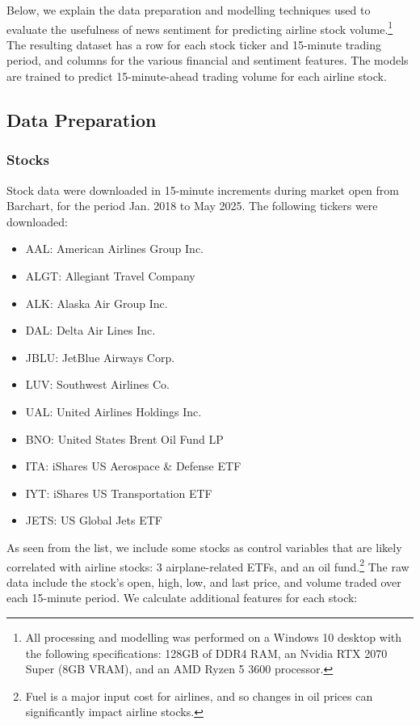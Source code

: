 \documentclass[12pt]{article}
\begin{document}
Below, we explain the data preparation and modelling techniques used to evaluate the usefulness of news sentiment for predicting airline stock volume.\footnote{All processing and modelling was performed on a Windows 10 desktop with the following specifications: 128GB of DDR4 RAM, an Nvidia RTX 2070 Super (8GB VRAM), and an AMD Ryzen 5 3600 processor.} The resulting dataset has a row for each stock ticker and 15-minute trading period, and columns for the various financial and sentiment features. The models are trained to predict 15-minute-ahead trading volume for each airline stock.

\subsection{Data Preparation}
\subsubsection{Stocks}
Stock data were downloaded in 15-minute increments during market open from Barchart, for the period Jan. 2018 to May 2025. The following tickers were downloaded:
\begin{itemize}
\singlespacing
    \item AAL: American Airlines Group Inc.
    \item ALGT: Allegiant Travel Company
    \item ALK: Alaska Air Group Inc.
    \item DAL: Delta Air Lines Inc.
    \item JBLU: JetBlue Airways Corp.
    \item LUV: Southwest Airlines Co.
    \item UAL: United Airlines Holdings Inc.
    \item BNO: United States Brent Oil Fund LP
    \item ITA: iShares US Aerospace \& Defense ETF
    \item IYT: iShares US Transportation ETF
    \item JETS: US Global Jets ETF
\end{itemize}
As seen from the list, we include some stocks as control variables that are likely correlated with airline stocks: 3 airplane-related ETFs, and an oil fund.\footnote{Fuel is a major input cost for airlines, and so changes in oil prices can significantly impact airline stocks.} The raw data include the stock's open, high, low, and last price, and volume traded over each 15-minute period. We calculate additional features for each stock:
\end{document}
